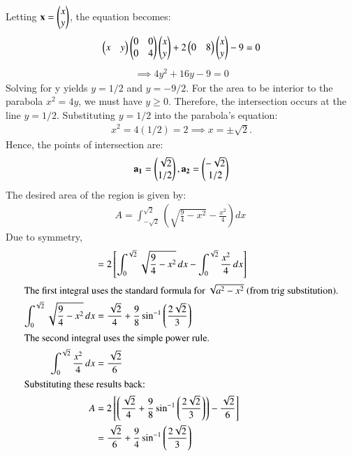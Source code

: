 \documentclass[article]{IEEEtran}
\begin{document}
Letting $\mathbf{x} = \begin{pmatrix}x \\ y\end{pmatrix}$, the equation becomes:
\begin{align} \begin{pmatrix}x & y\end{pmatrix} \begin{pmatrix}0 & 0 \\ 0 & 4\end{pmatrix} \begin{pmatrix}x \\ y\end{pmatrix} + 2 \begin{pmatrix}0 & 8\end{pmatrix} \begin{pmatrix}x \\ y\end{pmatrix} - 9 = 0 \end{align}
\begin{align} \implies 4y^2 + 16y - 9 = 0 \end{align}
Solving for y yields $y = 1/2$ and $y = -9/2$. For the area to be interior to the parabola $x^2 = 4y$, we must have $y \ge 0$. Therefore, the intersection occurs at the line $y = 1/2$. Substituting $y = 1/2$ into the parabola's equation:
\begin{align} x^2 = 4(1/2) = 2 \implies x = \pm\sqrt{2}. \end{align}
Hence, the points of intersection are:
\begin{align} 
\mathbf{a_1} = \begin{pmatrix}\sqrt{2} \\ 1/2\end{pmatrix}, \mathbf{a_2} = \begin{pmatrix}-\sqrt{2} \\ 1/2\end{pmatrix}
\end{align}
The desired area of the region is given by:
\begin{align} A = \int_{-\sqrt{2}}^{\sqrt{2}} \left( \sqrt{\frac{9}{4} - x^2} - \frac{x^2}{4} \right) dx \
\end{align}
Due to symmetry,
\begin{align}
	&= 2 \left[ \int_{0}^{\sqrt{2}} \sqrt{\frac{9}{4} - x^2} \, dx - \int_{0}^{\sqrt{2}} \frac{x^2}{4} \, dx \right] \\
	\intertext{The first integral uses the standard formula for $\sqrt{a^2-x^2}$ (from trig substitution).}
	\int_{0}^{\sqrt{2}} \sqrt{\frac{9}{4} - x^2} \, dx &= \frac{\sqrt{2}}{4} + \frac{9}{8}\sin^{-1}\left(\frac{2\sqrt{2}}{3}\right) \\
	\intertext{The second integral uses the simple power rule.}
	\int_{0}^{\sqrt{2}} \frac{x^2}{4} \, dx &= \frac{\sqrt{2}}{6} \\
	\intertext{Substituting these results back:}
	A &= 2 \left[ \left( \frac{\sqrt{2}}{4} + \frac{9}{8}\sin^{-1}\left(\frac{2\sqrt{2}}{3}\right) \right) - \frac{\sqrt{2}}{6} \right] \\
	&= \frac{\sqrt{2}}{6} + \frac{9}{4}\sin^{-1}\left(\frac{2\sqrt{2}}{3}\right)
\end{align}
\end{document}
